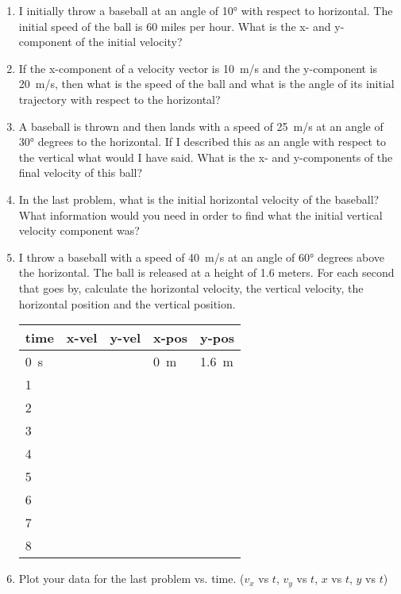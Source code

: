 \begin{enumerate}
	\setlength\itemsep{2 in}
	
	\item I initially throw a baseball at an angle of \ang{10} with respect to horizontal. The initial speed of the ball is 60 miles per hour. What is the x- and y- component of the initial velocity?
	
	\item If the x-component of a velocity vector is \SI{+10}{\meter/\second} and the y-component is \SI{+20}{\meter/\second}, then what is the speed of the ball and what is the angle of its initial trajectory with respect to the horizontal?
	
	\item A baseball is thrown and then lands with a speed of \SI{25}{m/s} at an angle of \ang{30} degrees to the horizontal. If I described this as an angle with respect to the vertical what would I have said. What is the x- and y-components of the final velocity of this ball?
	
	\item In the last problem, what is the initial horizontal velocity of the baseball? What information would you need in order to find what the initial vertical velocity component was?
	
	\item I throw a baseball with a speed of \SI{40}{m/s} at an angle of \ang{60} degrees above the horizontal. The ball is released at a height of 1.6 meters. For each second that goes by, calculate the horizontal velocity, the vertical velocity, the horizontal position and the vertical position.
	
	\begin{tabular}{lllll}
		\hline
		time & x-vel & y-vel & x-pos & y-pos \\
		\hline
		\hline
		\SI{0}{\second}&&&\SI{0}{\meter}&\SI{1.6}{\meter} \\
		1& \\
		2\\
		3\\
		4\\
		5\\
		6\\
		7\\
		8\\
		
	\end{tabular}
	
	\item Plot your data for the last problem vs. time. ($v_x$ vs $t$, $v_{y}$ vs $t$, $x$ vs $t$, $y$ vs $t$) \hugeskip
	

\end{enumerate}
